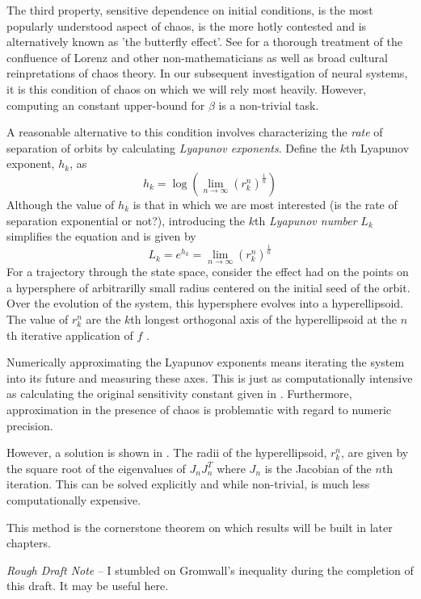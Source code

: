 \documentclass{elsart1p}
\begin{document}
The third property, sensitive dependence on initial conditions, is the most
popularly understood aspect of chaos, is the more hotly contested and 
is alternatively known as 'the butterfly effect'.  
See \cite{history} for a thorough treatment of the
confluence of Lorenz and other non-mathematicians as well as broad cultural reinpretations of chaos theory.  In our subsequent investigation of neural systems,
it is this condition of chaos on which we will rely most heavily.  However,
computing an constant upper-bound for $\beta$ is a non-trivial task.

A reasonable alternative to this condition 
involves characterizing the \textit{rate} of
separation of orbits by calculating \textit{Lyapunov exponents}.
Define the $k$th Lyapunov exponent, $h_{k}$, as
$$h_{k} = \log \left( \lim \limits_{n \to \infty} (r_{k}^{n})^{\frac{1}{n}}\right)$$
Although the value of $h_{k}$ is that in which we are most interested (is the rate of separation exponential or not?), introducing the $k$th \textit{Lyapunov number} $L_{k}$ simplifies the equation and is given by
$$L_{k} = e^{h_{k}} = \lim \limits_{n \to \infty} (r_{k}^{n})^{\frac{1}{n}}$$
For a trajectory through the state space, consider the effect had on the points on a hypersphere of arbitrarilly small radius centered on the initial seed of 
the orbit.  Over the evolution of the system, this hypersphere evolves into
a hyperellipsoid.
The value of $r_{k}^{n}$ are the $k$th longest orthogonal axis of the hyperellipsoid at the $n$th iterative application of $f$ \cite{alligood, nikilov, verstraeten}.

Numerically approximating the Lyapunov exponents means iterating the system
into its future and measuring these axes.  This is just as computationally
intensive as calculating the original sensitivity constant given in \cite{hirsch}.  Furthermore, approximation in the presence of chaos
is problematic with regard to numeric precision.

However, a solution is shown in \cite{alligood}.
The radii of the hyperellipsoid, $r_{k}^{n}$, are given by the
square root of the eigenvalues of $J_{n}J_{n}^{T}$ where $J_{n}$ is the 
Jacobian of the $n$th iteration.  This can be solved explicitly and
while non-trivial, is much less computationally expensive.

This method is the cornerstone theorem on which results will be built in later
chapters.

\textit{Rough Draft Note} -- I stumbled on Gromwall's inequality during the
completion of this draft.  It may be useful here.
\end{document}
